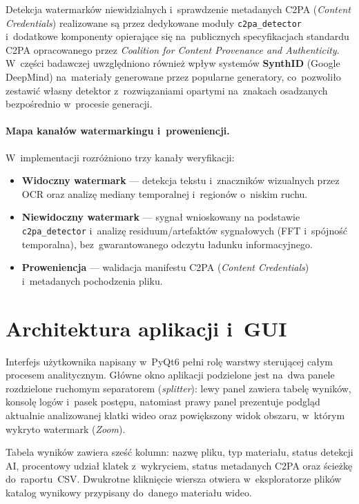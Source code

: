 Detekcja watermarków niewidzialnych i~sprawdzenie metadanych C2PA
(\textit{Content Credentials}) realizowane są przez dedykowane moduły
\texttt{c2pa\_detector} i~dodatkowe komponenty opierające się
na~publicznych specyfikacjach standardu C2PA opracowanego przez
\textit{Coalition for Content Provenance and Authenticity}.
W~części badawczej uwzględniono również wpływ systemów
\textbf{SynthID} (Google DeepMind) na~materiały generowane przez popularne
generatory, co~pozwoliło zestawić własny detektor z~rozwiązaniami
opartymi na~znakach osadzanych bezpośrednio w~procesie generacji.

\paragraph{Mapa kanałów watermarkingu i~proweniencji.}
W~implementacji rozróżniono trzy kanały weryfikacji:
\begin{itemize}
  \item \textbf{Widoczny watermark} --- detekcja tekstu i~znaczników wizualnych
    przez OCR oraz analizę mediany temporalnej i~regionów o~niskim ruchu.
  \item \textbf{Niewidoczny watermark} --- sygnał wnioskowany na podstawie
    \texttt{c2pa\_detector} i~analizę residuum/artefaktów sygnałowych
    (FFT i~spójność temporalna), bez~gwarantowanego odczytu ładunku informacyjnego.
  \item \textbf{Proweniencja} --- walidacja manifestu C2PA
    (\textit{Content Credentials}) i~metadanych pochodzenia pliku.
\end{itemize}

\section{Architektura aplikacji i~GUI}

Interfejs użytkownika napisany w~PyQt6 pełni rolę warstwy sterującej
całym procesem analitycznym. Główne okno aplikacji podzielone jest
na~dwa panele rozdzielone ruchomym separatorem (\textit{splitter}): lewy panel
zawiera tabelę wyników, konsolę logów i~pasek postępu,
natomiast prawy panel prezentuje podgląd aktualnie analizowanej klatki wideo
oraz powiększony widok obszaru, w~którym wykryto watermark (\textit{Zoom}).

Tabela wyników zawiera sześć kolumn: nazwę pliku, typ materiału,
status detekcji AI, procentowy udział klatek z~wykryciem, status metadanych C2PA
oraz ścieżkę do~raportu~CSV. Dwukrotne kliknięcie wiersza otwiera
w~eksploratorze plików katalog wynikowy przypisany do~danego materiału wideo.


